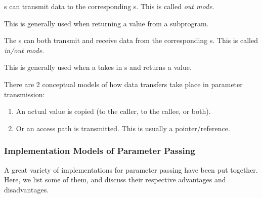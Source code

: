 \begin{definition}\label{def:Parameter_Passing-Out_Mode}
  s can transmit data to the corresponding s.
  This is called \emph{out mode}.

  This is generally used when returning a value from a subprogram.
\end{definition}

\begin{definition}\label{def:Parameter_Passing-Inout_Mode}
  The s can both transmit and receive data from the corresponding s.
  This is called \emph{in/out mode}.

  This is generally used when a  takes in s and returns a value.
\end{definition}

There are 2 conceptual models of how data transfers take place in parameter transmission:
\begin{enumerate}[noitemsep]
\item An actual value is copied (to the caller, to the callee, or both).
\item Or an access path is transmitted. This is usually a pointer/reference.
\end{enumerate}

\subsubsection{Implementation Models of Parameter Passing}\label{subsubsec:Implementation_Models_Parameter_Passing}
A great variety of implementations for parameter passing have been put together.
Here, we list some of them, and discuss their respective advantages and disadvantages.

